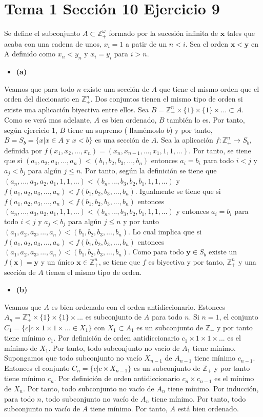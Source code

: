 \documentclass{article}
\newcommand{\vect}[1]{\boldsymbol{#1}}
\begin{document}
\section{Tema 1 Sección 10 Ejercicio 9}
Se define el subconjunto $A\subset \mathbb{Z}_{+}^{\omega}$ formado por la sucesión infinita de $\vect{x}$ tales que acaba con una cadena de unos, $x_i=1$ a patir de un $n<i$. Sea el orden $\vect{x}<\vect{y}$ en A definido como $x_n<y_n$ y $x_i=y_i$ para $i>n$.
\begin{itemize}
\item \bf(a)\rm
\end{itemize}
Veamos que para todo $n$ existe una sección de $A$ que tiene el mismo orden que el orden del diccionario en $\mathbb{Z}^n_{+}$. Dos conjuntos tienen el mismo tipo de orden si existe una aplicación biyectiva entre ellos.
Sea $B=\mathbb{Z}^n_{+}\times \{1\}\times \{1\}\times...\subset A$. Como se verá mas adelante, $A$ es bien ordenado, $B$ también lo es. Por tanto, según ejercicio 1, $B$ tiene un supremo ( llamémoslo  $b$) y por tanto, $B=S_{b}=\{x|x\in A \text{ y }x<b\}$ es una sección de $A$. Sea la aplicación $f:\mathbb{Z}^n_{+}\rightarrow S_{b}$, definida por $f(x_1,x_2,...,x_n)=(x_n,x_{n-1},...,x_1,1,1,...)$. Por tanto, se tiene que si $(a_1,a_2,a_3,...,a_n)<(b_1,b_2,b_3,...,b_n)$ entonces $a_i=b_i$ para todo $i<j$ y $a_j<b_j$ para algún $j\leq n$. Por tanto, según la definición se tiene que $(a_n,...,a_3,a_2,a_1,1,1,...)<(b_n,...,b_3,b_2,b_1,1,1,...)$ y $f(a_1,a_2,a_3,...,a_n)<f(b_1,b_2,b_3,...,b_n)$. Igualmente se tiene que si $f(a_1,a_2,a_3,...,a_n)<f(b_1,b_2,b_3,...,b_n)$ entonces $(a_n,...,a_3,a_2,a_1,1,1,...)<(b_n,...,b_3,b_2,b_1,1,1,...)$ y entonces $a_i=b_i$ para todo $i<j$ y $a_j<b_j$ para algún $j\leq n$ y por tanto $(a_1,a_2,a_3,...,a_n)<(b_1,b_2,b_3,...,b_n)$. Lo cual implica que si $f(a_1,a_2,a_3,...,a_n)<f(b_1,b_2,b_3,...,b_n)$ entonces $(a_1,a_2,a_3,...,a_n)<(b_1,b_2,b_3,...,b_n)$. Como para todo  $\vect{y}\in S_{b}$ existe un $f(\vect{x})=\vect{y}$ y un único $\vect{x}\in \mathbb{Z}^n_{+}$, se tiene que $f$ es biyectiva y por tanto, $\mathbb{Z}^n_{+}$ y una sección de $A$ tienen el mismo tipo de orden.
\begin{itemize}
\item \bf(b)\rm
\end{itemize}
Veamos que $A$ es bien ordenado con el orden antidiccionario.  Estonces $A_n=\mathbb{Z}^n_{+}\times \{1\}\times \{1\}\times...$ es subconjunto de $A$ para todo $n$. Si $n=1$, el conjunto $C_1=\{c|c\times 1 \times 1 \times ...\in X_1\}$ con $X_1\subset A_1$ es un subconjunto de $\mathbb{Z}_{+}$ y por tanto tiene mínimo $c_1$. Por definición de orden antidiccionario $c_1\times 1 \times 1 \times ...$ es el mínimo de $X_1$. Por tanto, todo subconjunto no vacío de $A_1$ tiene mínimo. Supongamos que todo subconjunto no vacío $X_{n-1}$ de $A_{n-1}$ tiene mínimo $c_{n-1}$. Entonces el conjunto $C_n=\{c|c\times X_{n-1}\}$ es un subconjunto de $\mathbb{Z}_{+}$ y por tanto tiene mínimo $c_n$. Por definición de orden antidiccionario $c_n\times c_{n-1}$ es el mínimo de $X_n$. Por tanto, todo subconjunto no vacío de $A_n$ tiene mínimo. Por inducción, para todo $n$, 
todo subconjunto no vacío de $A_n$ tiene mínimo. Por tanto, todo subconjunto no vacío de $A$ tiene mínimo. Por tanto, $A$ está bien ordenado.
\end{document}
